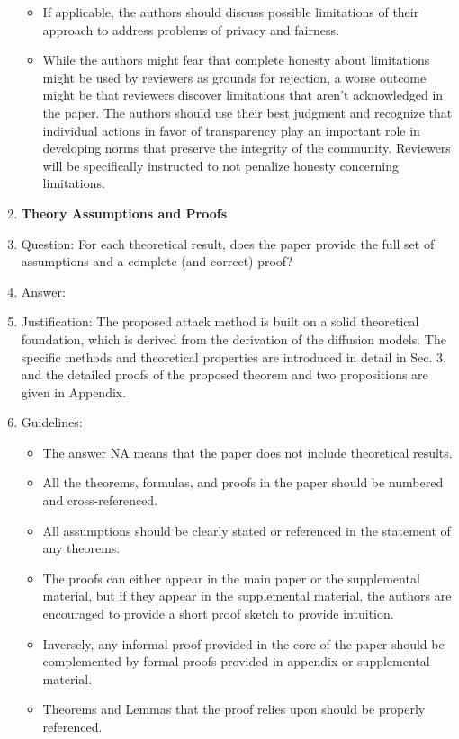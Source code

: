 \documentclass{article}
\begin{document}
\begin{enumerate}
\begin{itemize}
        \item If applicable, the authors should discuss possible limitations of their approach to address problems of privacy and fairness.
        \item While the authors might fear that complete honesty about limitations might be used by reviewers as grounds for rejection, a worse outcome might be that reviewers discover limitations that aren't acknowledged in the paper. The authors should use their best judgment and recognize that individual actions in favor of transparency play an important role in developing norms that preserve the integrity of the community. Reviewers will be specifically instructed to not penalize honesty concerning limitations.
    \end{itemize}

\item {\bf Theory Assumptions and Proofs}
    \item[] Question: For each theoretical result, does the paper provide the full set of assumptions and a complete (and correct) proof?
    \item[] Answer: \answerYes{} %
    \item[] Justification: The proposed attack method is built on a solid theoretical foundation, which is derived from the derivation of the diffusion models. The specific methods and theoretical properties are introduced in detail in Sec. 3, and the detailed proofs of the proposed theorem and two propositions are given in Appendix.
    \item[] Guidelines:
    \begin{itemize}
        \item The answer NA means that the paper does not include theoretical results. 
        \item All the theorems, formulas, and proofs in the paper should be numbered and cross-referenced.
        \item All assumptions should be clearly stated or referenced in the statement of any theorems.
        \item The proofs can either appear in the main paper or the supplemental material, but if they appear in the supplemental material, the authors are encouraged to provide a short proof sketch to provide intuition. 
        \item Inversely, any informal proof provided in the core of the paper should be complemented by formal proofs provided in appendix or supplemental material.
        \item Theorems and Lemmas that the proof relies upon should be properly referenced. 
    \end{itemize}


\end{enumerate}
\end{document}
